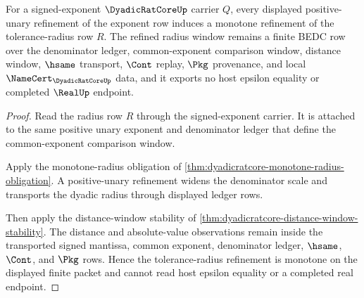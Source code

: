 \begin{theorem}
\label{thm:dyadic-rat-core-tolerance-radius-monotonicity}
For a signed-exponent $\DyadicRatCoreUp$ carrier $Q$, every displayed positive-unary refinement of the exponent row induces a monotone refinement of the tolerance-radius row $R$. The refined radius window remains a finite BEDC row over the denominator ledger, common-exponent comparison window, distance window, $\hsame$ transport, $\Cont$ replay, $\Pkg$ provenance, and local $\NameCert_{\DyadicRatCoreUp}$ data, and it exports no host epsilon equality or completed $\RealUp$ endpoint.
\end{theorem}
\begin{proof}
Read the radius row $R$ through the signed-exponent carrier. It is attached to the same positive unary exponent and denominator ledger that define the common-exponent comparison window.

Apply the monotone-radius obligation of \autoref{thm:dyadicratcore-monotone-radius-obligation}. A positive-unary refinement widens the denominator scale and transports the dyadic radius through displayed ledger rows.

Then apply the distance-window stability of \autoref{thm:dyadicratcore-distance-window-stability}. The distance and absolute-value observations remain inside the transported signed mantissa, common exponent, denominator ledger, $\hsame$, $\Cont$, and $\Pkg$ rows. Hence the tolerance-radius refinement is monotone on the displayed finite packet and cannot read host epsilon equality or a completed real endpoint.
\end{proof}

